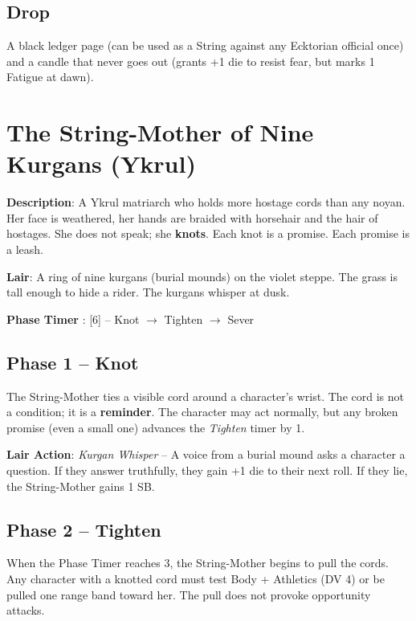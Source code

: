 \subsection*{Drop}
\noindent A black ledger page (can be used as a String against any Ecktorian official once) and a candle that never goes out (grants +1 die to resist fear, but marks 1 Fatigue at dawn).


\section*{The String-Mother of Nine Kurgans (Ykrul)}

\noindent\textbf{Description}: A Ykrul matriarch who holds more hostage cords than any noyan. Her face is weathered, her hands are braided with horsehair and the hair of hostages. She does not speak; she \textbf{knots}. Each knot is a promise. Each promise is a leash.

\noindent\textbf{Lair}: A ring of nine kurgans (burial mounds) on the violet steppe. The grass is tall enough to hide a rider. The kurgans whisper at dusk.

\noindent\textbf{Phase Timer }: [6] -- Knot $\rightarrow$ Tighten $\rightarrow$ Sever

\subsection*{Phase 1 -- Knot}

\noindent The String-Mother ties a visible cord around a character's wrist. The cord is not a condition; it is a \textbf{reminder}. The character may act normally, but any broken promise (even a small one) advances the \emph{Tighten} timer by 1.

\noindent\textbf{Lair Action}: \emph{Kurgan Whisper} -- A voice from a burial mound asks a character a question. If they answer truthfully, they gain +1 die to their next roll. If they lie, the String-Mother gains 1 SB.

\subsection*{Phase 2 -- Tighten}

\noindent When the Phase Timer reaches 3, the String-Mother begins to pull the cords. Any character with a knotted cord must test Body + Athletics (DV 4) or be pulled one range band toward her. The pull does not provoke opportunity attacks.

